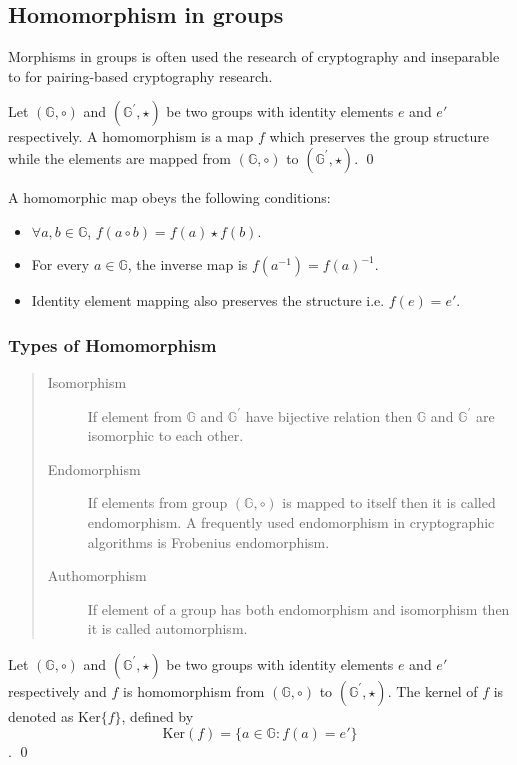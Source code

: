 \subsection{Homomorphism in groups }
Morphisms in groups is often used the research of cryptography and inseparable to for pairing-based cryptography research.
\begin{definition}
	Let $(\mathbb{G},\circ)$ and $(\mathbb{G}^{'},\star)$ be two groups with identity elements $e$ and $e'$ respectively.
	A homomorphism  is a map $f$ which preserves the group structure while the elements are mapped from $(\mathbb{G},\circ)$ to $(\mathbb{G}^{'},\star)$.
	\qed
\end{definition}
	A homomorphic map obeys the following conditions:
	\begin{itemize}
		\item $\forall a,b \in \mathbb{G}$, $f(a \circ b) = f(a) \star f(b)$.
		\item  For every $a \in \mathbb{G}$, the inverse map is $f(a^{-1}) = f(a)^{-1}$.
		\item  Identity element mapping also preserves the structure i.e. $f(e) =e'$.
	\end{itemize}

\subsubsection*{Types of Homomorphism}
\begin{quote}
	\begin{description}
				\item[Isomorphism ] If element from $\mathbb{G}$  and $\mathbb{G}^{'}$ have bijective relation then $\mathbb{G}$ and $\mathbb{G}^{'}$ are isomorphic to each other.
					
			\item[Endomorphism  ]  If elements from group $(\mathbb{G},\circ)$ is mapped to itself then it is called endomorphism. 
			A frequently used endomorphism in cryptographic algorithms is Frobenius endomorphism. 
			
			\item[Authomorphism  ] If element of a group has both endomorphism and isomorphism then it is called automorphism.
	\end{description}
\end{quote}

\begin{definition}
	Let $(\mathbb{G},\circ)$ and $(\mathbb{G}^{'},\star)$ be two groups with identity elements $e$ and $e'$ respectively and $f$ is homomorphism from $(\mathbb{G},\circ)$ to $(\mathbb{G}^{'},\star)$.
	The kernel of $f$ is denoted as $\text{Ker}\{f\}$, defined by 
	$$\text{Ker}(f) = \{ a \in \mathbb{G}: f(a) = e'\}$$.
	\qed
\end{definition}

